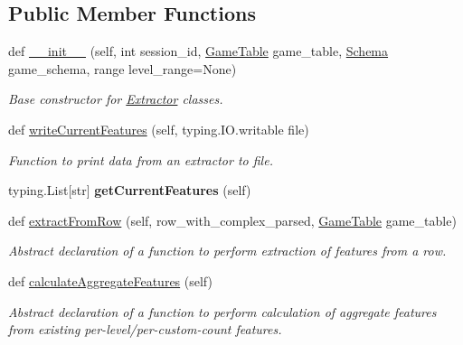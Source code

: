 \subsection*{Public Member Functions}
\begin{DoxyCompactItemize}
\item 
def \mbox{\hyperlink{classfeature__extractors_1_1_extractor_1_1_extractor_a0074111f7f38f5205766e5e88d3fb62c}{\+\_\+\+\_\+init\+\_\+\+\_\+}} (self, int session\+\_\+id, \mbox{\hyperlink{class_game_table_1_1_game_table}{Game\+Table}} game\+\_\+table, \mbox{\hyperlink{classschemas_1_1_schema_1_1_schema}{Schema}} game\+\_\+schema, range level\+\_\+range=None)
\begin{DoxyCompactList}\small\item\em Base constructor for \mbox{\hyperlink{classfeature__extractors_1_1_extractor_1_1_extractor}{Extractor}} classes. \end{DoxyCompactList}\item 
def \mbox{\hyperlink{classfeature__extractors_1_1_extractor_1_1_extractor_a532d1edd279592d6a7bc287d6de2a310}{write\+Current\+Features}} (self, typing.\+I\+O.\+writable file)
\begin{DoxyCompactList}\small\item\em Function to print data from an extractor to file. \end{DoxyCompactList}\item 
\mbox{\label{classfeature__extractors_1_1_extractor_1_1_extractor_af3bfb3281b2ed3310f65e8317947354d}} 
typing.\+List\mbox{[}str\mbox{]} {\bfseries get\+Current\+Features} (self)
\item 
def \mbox{\hyperlink{classfeature__extractors_1_1_extractor_1_1_extractor_a98fc31f77b3c7650f49480097f1f6da4}{extract\+From\+Row}} (self, row\+\_\+with\+\_\+complex\+\_\+parsed, \mbox{\hyperlink{class_game_table_1_1_game_table}{Game\+Table}} game\+\_\+table)
\begin{DoxyCompactList}\small\item\em Abstract declaration of a function to perform extraction of features from a row. \end{DoxyCompactList}\item 
def \mbox{\hyperlink{classfeature__extractors_1_1_extractor_1_1_extractor_a7622c0b66dd98f59a8010c3511f4bdad}{calculate\+Aggregate\+Features}} (self)
\begin{DoxyCompactList}\small\item\em Abstract declaration of a function to perform calculation of aggregate features from existing per-\/level/per-\/custom-\/count features. \end{DoxyCompactList}\end{DoxyCompactItemize}
